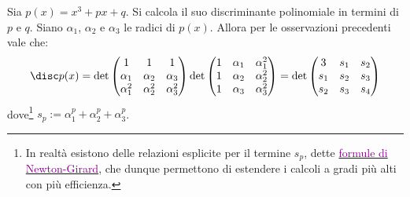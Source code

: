 \documentclass[11pt]{scrartcl}
\begin{document}
	\begin{remark}
		Sia $p(x) = x^3 + px + q$. Si calcola il suo discriminante polinomiale
		in termini di $p$ e $q$. Siano $\alpha_1$, $\alpha_2$ e $\alpha_3$ le radici di $p(x)$.
		Allora per le osservazioni precedenti vale che:
		\[ \disc p(x) = \det \begin{pmatrix}
			1 & 1 & 1 \\ \alpha_1 & \alpha_2 & \alpha_3 \\ \alpha_1^2 & \alpha_2^2 & \alpha_3^2
		\end{pmatrix} \det \begin{pmatrix} 1 & \alpha_1 & \alpha_1^2 \\ 1 & \alpha_2 & \alpha_2^2 \\ 1 & \alpha_3 & \alpha_3^2 \end{pmatrix} = \det \begin{pmatrix}
			3 & s_1 & s_2 \\ s_1 & s_2 & s_3 \\ s_2 & s_3 & s_4 
		\end{pmatrix}\]
		dove\footnote{
			In realtà esistono delle relazioni esplicite per il termine $s_p$, dette
			\href{https://it.wikipedia.org/wiki/Identit\%C3\%A0_di_Newton}{\textcolor{purple}{formule di Newton-Girard}}, che dunque permettono di estendere i calcoli
			a gradi più alti con più efficienza.
		} $s_p := \alpha_1^p + \alpha_2^p + \alpha_3^p$. \medskip
		

\end{remark}
\end{document}
